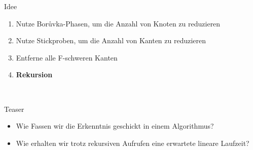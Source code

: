 \documentclass[10pt]{beamer}
\begin{document}
\begin{frame}{Idee}
    \begin{enumerate}
        \item Nutze Bor\r uvka-Phasen, um die Anzahl von Knoten zu reduzieren
        \item Nutze Stickproben, um die Anzahl von Kanten zu reduzieren
        \item Entferne alle F-schweren Kanten
        \item \textbf{Rekursion}
    \end{enumerate}\\
\end{frame}
\begin{frame}{Teaser}
    \begin{itemize}
        \item Wie Fassen wir die Erkenntnis geschickt in einem Algorithmus?
        \item Wie erhalten wir trotz rekursiven Aufrufen eine erwartete lineare
              Laufzeit?
    \end{itemize}
\end{frame}
\end{document}
